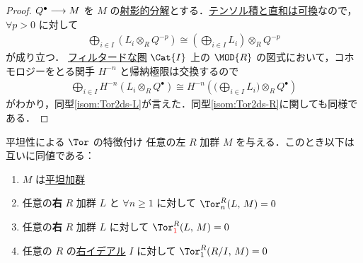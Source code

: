 \documentclass[algtopo_main]{subfiles}
\begin{document}
\begin{proof}
    $Q^\bullet \longrightarrow M$ を $M$ の\hyperref[def:projective-resolution]{射影的分解}とする．\hyperref[prop:comm-lim2tensor]{テンソル積と直和は可換}なので，$\forall p > 0$ に対して
    \begin{align}
        \bigoplus_{i \in I} (L_i \otimes_R Q^{-p}) \cong \left( \bigoplus_{i \in I} L_i \right)  \otimes_R Q^{-p}
    \end{align}
    が成り立つ．
    \hyperref[def:filtered]{フィルタードな圏} $\Cat{I}$ 上の $\MOD{R}$ の図式において，コホモロジーをとる関手 $H^{-n}$ と帰納極限は交換するので
    \begin{align}
        \bigoplus_{i \in I} H^{-n} (L_i \otimes_R Q^{\bullet}) \cong H^{-n}\left( \biggl( \bigoplus_{i \in I} L_i \biggr)  \otimes_R Q^{\bullet} \right)
    \end{align}
    がわかり，同型\eqref{isom:Tor2ds-L}が言えた．同型\eqref{isom:Tor2ds-R}に関しても同様である．
\end{proof}

\begin{myprop}[label=prop:Tor-flat-1]{平坦性による $\Tor$ の特徴付け}
    任意の左 $R$ 加群 $M$ を与える．このとき以下は互いに同値である：
    \begin{enumerate}
        \item $M$ は\hyperref[def:flat-mod]{平坦加群}
        \item 任意の\textbf{右} $R$ 加群 $L$ と $\forall n \ge 1$ に対して $\Tor^R_n(L,\, M) = 0$
        \item 任意の\textbf{右} $R$ 加群 $L$ に対して $\Tor^R_{\textcolor{red}{1}}(L,\, M) = 0$
        \item 任意の $R$ の\hyperref[def:ideal]{右イデアル} $I$ に対して $\Tor^R_1(R/I,\, M) = 0$
    \end{enumerate}
\end{myprop}
\end{document}

